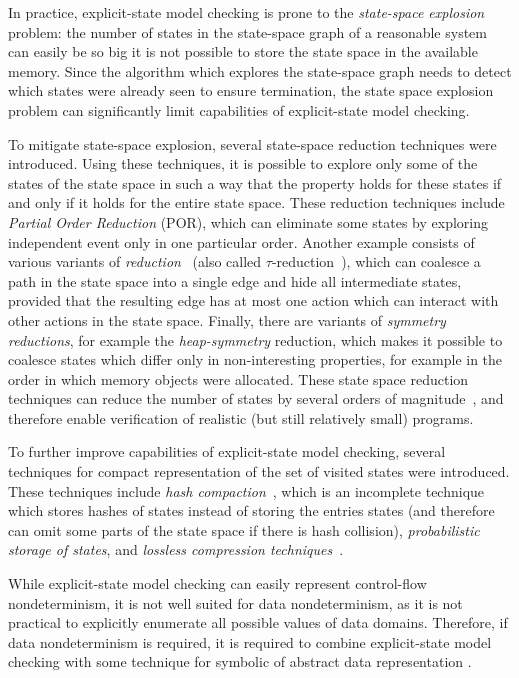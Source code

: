 In practice, explicit-state model checking is prone to the \emph{state-space
explosion} problem: the number of states in the state-space graph of a
reasonable system can easily be so big it is not possible to store the state
space in the available memory.
Since the algorithm which explores the state-space graph needs to detect which
states were already seen to ensure termination, the state space explosion
problem can significantly limit capabilities of explicit-state model checking.

To mitigate state-space explosion, several state-space reduction techniques
were introduced.
Using these techniques, it is possible to explore only some of the states of
the state space in such a way that the property holds for these states if and
only if it holds for the entire state space.
These reduction techniques include \emph{Partial Order Reduction} (POR), which
can eliminate some states by exploring independent event only in one particular
order.
Another example consists of various variants of \emph{
reduction}~\cite{TODO} (also called $\tau$-reduction~\cite{TODO}), which can
coalesce a path in the state space into a single edge and hide all intermediate
states, provided that the resulting edge has at most one action which can
interact with other actions in the state space.
Finally, there are variants of \emph{symmetry reductions}, for example the
\emph{heap-symmetry} reduction, which makes it possible to coalesce states
which differ only in non-interesting properties, for example in the order in
which memory objects were allocated.
These state space reduction techniques can reduce the number of states by
several orders of magnitude~\cite{TODO}, and therefore enable verification of
realistic (but still relatively small) programs.

To further improve capabilities of explicit-state model checking, several
techniques for compact representation of the set of visited states were
introduced.
These techniques include \emph{hash compaction}~\cite{TODO}, which is an
incomplete technique which stores hashes of states instead of storing the
entries states (and therefore can omit some parts of the state space if there
is hash collision), \emph{probabilistic storage of states}, and
\emph{lossless compression techniques}~\cite{RSB15TC,TODO}.

 While explicit-state model checking can easily represent
control-flow nondeterminism, it is not well suited for data nondeterminism, as
it is not practical to explicitly enumerate all possible values of data
domains.
Therefore, if data nondeterminism is required, it is required to combine explicit-state model checking with some technique for symbolic of abstract data representation .

